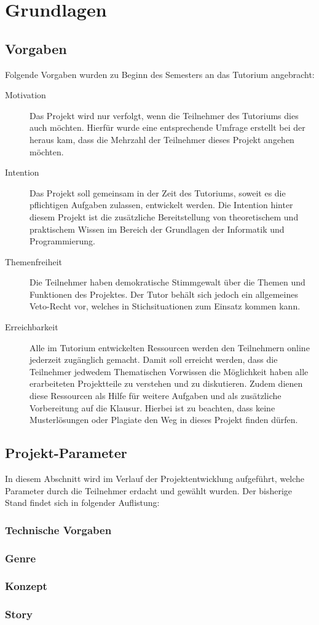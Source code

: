 
\section{Grundlagen}
\label{ch:basics}

\subsection{Vorgaben}
\label{ch:presets}
Folgende Vorgaben wurden zu Beginn des Semesters an das Tutorium angebracht:
\begin{description}
	\item[Motivation] Das Projekt wird nur verfolgt, wenn die Teilnehmer des Tutoriums dies auch möchten. Hierfür wurde eine entsprechende Umfrage erstellt bei der heraus kam, dass die Mehrzahl der Teilnehmer dieses Projekt angehen möchten.
	\item[Intention] Das Projekt soll gemeinsam in der Zeit des Tutoriums, soweit es die pflichtigen Aufgaben zulassen, entwickelt werden. Die Intention hinter diesem Projekt ist die zusätzliche Bereitstellung von theoretischem und praktischem Wissen im Bereich der Grundlagen der Informatik und Programmierung.
	\item[Themenfreiheit] Die Teilnehmer haben demokratische Stimmgewalt über die Themen und Funktionen des Projektes. Der Tutor behält sich jedoch ein allgemeines Veto-Recht vor, welches in Stichsituationen zum Einsatz kommen kann.
	\item[Erreichbarkeit] Alle im Tutorium entwickelten Ressourcen werden den Teilnehmern online jederzeit zugänglich gemacht. Damit soll erreicht werden, dass die Teilnehmer jedwedem Thematischen Vorwissen die Möglichkeit haben alle erarbeiteten Projektteile zu verstehen und zu diskutieren. Zudem dienen diese Ressourcen als Hilfe für weitere Aufgaben und als zusätzliche Vorbereitung auf die Klausur. Hierbei ist zu beachten, dass keine Musterlösungen oder Plagiate den Weg in dieses Projekt finden dürfen.
\end{description}

\subsection{Projekt-Parameter}
\label{ch:params}
In diesem Abschnitt wird im Verlauf der Projektentwicklung aufgeführt, welche Parameter durch die Teilnehmer erdacht und gewählt wurden. Der bisherige Stand findet sich in folgender Auflistung:

\subsubsection{Technische Vorgaben}
\label{ch:technical}
\subsubsection{Genre}
\label{ch:genre}
\subsubsection{Konzept}
\label{ch:concept}
\subsubsection{Story}
\label{ch:story}